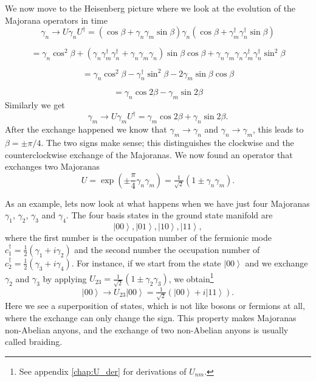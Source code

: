 We now move to the Heisenberg picture where we look at the evolution of the Majorana operators in time
\[
\gamma_{n}\to U\gamma_{n}U^{\dagger}=\left(\cos\beta+\gamma_{n}\gamma_{m}\sin\beta\right)\gamma_{n}\left(\cos\beta+\gamma_{m}^{\dagger}\gamma_{n}^{\dagger}\sin\beta\right)
\]

\[
=\gamma_{n}\cos^{2}\beta+\left(\gamma_{n}\gamma_{m}^{\dagger}\gamma_{n}^{\dagger}+\gamma_{n}\gamma_{m}\gamma_{n}\right)\sin\beta\cos\beta+\gamma_{n}\gamma_{m}\gamma_{n}\gamma_{m}^{\dagger}\gamma_{n}^{\dagger}\sin^{2}\beta
\]

\[
=\gamma_{n}\cos^{2}\beta-\gamma_{n}^{\dagger}\sin^{2}\beta-2\gamma_{m}\sin\beta\cos\beta
\]

\[
=\gamma_{n}\cos2\beta-\gamma_{m}\sin2\beta
\]
Similarly we get
\[
\gamma_{m}\to U\gamma_{m}U^{\dagger}=\gamma_{m}\cos2\beta+\gamma_{n}\sin2\beta.
\]
After the exchange happened we know that $\gamma_{m}\to\gamma_{n}$ and $\gamma_{n}\to\gamma_{m}$, this leads to $\beta=\pm\pi/4$.
The two signs make sense; this distinguishes the clockwise and the counterclockwise exchange of the Majoranas.
We now found an operator that exchanges two Majoranas
\begin{equation}
U=\exp\left(\pm\frac{\pi}{4}\gamma_{n}\gamma_{m}\right)=\tfrac{1}{\sqrt{2}}\left(1\pm\gamma_{n}\gamma_{m}\right).\label{eq:U_nm}
\end{equation}

As an example, lets now look at what happens when we have just four Majoranas $\gamma_{1}$, $\gamma_{2}$, $\gamma_{3}$ and $\gamma_{4}$.
The four basis states in the ground state manifold are
\begin{equation}
\left|00\right\rangle ,\left|01\right\rangle ,\left|10\right\rangle ,\left|11\right\rangle ,\label{eq:basis}
\end{equation}
where the first number is the occupation number of the fermionic mode $c_{1}^{\dagger}=\tfrac{1}{2}(\gamma_{1}+i\gamma_{2})$ and the second number the occupation number of $c_{2}^{\dagger}=\tfrac{1}{2}(\gamma_{3}+i\gamma_{4})$.
For instance, if we start from the state $\left|00\right\rangle $ and we exchange $\gamma_{2}$ and $\gamma_{3}$ by applying $U_{23}=\tfrac{1}{\sqrt{2}}\left(1\pm\gamma_{2}\gamma_{3}\right)$, we obtain\footnote{See appendix \ref{chap:U_der} for derivations of $U_{nm}$.}
\[
\left|00\right\rangle \to U_{23}\left|00\right\rangle =\tfrac{1}{\sqrt{2}}\left(\left|00\right\rangle +i\left|11\right\rangle \right).
\]
Here we see a superposition of states, which is not like bosons or fermions at all, where the exchange can only change the sign.
This property makes Majoranas non-Abelian anyons, and the exchange of two non-Abelian anyons is usually called braiding.



